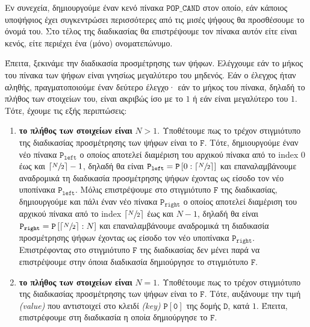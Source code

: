 	Εν συνεχεία, δημιουργούμε έναν κενό πίνακα $\mathtt{POP\_CAND}$ στον οποίο, εάν κάποιος υποψήφιος έχει συγκεντρώσει περισσότερες από τις μισές ψήφους θα προσθέσουμε το όνομά του. Στο τέλος της διαδικασίας θα επιστρέψουμε τον πίνακα αυτόν είτε είναι κενός, είτε περιέχει ένα (μόνο) ονοματεπώνυμο.\par
	Έπειτα, ξεκινάμε την διαδικασία προσμέτρησης των ψήφων. Ελέγχουμε εάν το μήκος του πίνακα των ψήφων είναι γνησίως μεγαλύτερο του μηδενός. Εάν ο έλεγχος ήταν αληθής, πραγματοποιούμε έναν δεύτερο έλεγχο· εάν το μήκος του πίνακα, δηλαδή το πλήθος των στοιχείων του, είναι ακριβώς ίσο με το $1$ ή εάν είναι μεγαλύτερο του $1$. Τότε, έχουμε τις εξής περιπτώσεις:\begin{enumerate}[label=\roman*.]
			\item \textbf{το πλήθος των στοιχείων είναι} $N>1$. Υποθέτουμε πως το τρέχον στιγμιότυπο της διαδικασίας προσμέτρησης των ψήφων είναι το $\mathtt{F}$. Τότε, δημιουργούμε έναν νέο πίνακα $\mathtt{P_{left}}$ ο οποίος αποτελεί διαμέριση του αρχικού πίνακα από το index $0$ έως και $\left\lceil\sfrac{N}{2}\right\rceil-1$, δηλαδή θα είναι $\mathtt{P_{left}=P}\left[0:\left\lceil\sfrac{N}{2}\right\rceil\right]$ και επαναλαμβάνουμε αναδρομικά τη διαδικασία προσμέτρησης ψήφων έχοντας ως είσοδο τον νέο υποπίνακα $\mathtt{P_{left}}$. Μόλις επιστρέψουμε στο στιγμιότυπο $\mathtt{F}$ της διαδικασίας, δημιουργούμε και πάλι έναν νέο πίνακα $\mathtt{P_{right}}$ ο οποίος αποτελεί διαμέριση του αρχικού πίνακα από το index $\left\lceil\sfrac{N}{2}\right\rceil$ έως και $N-1$, δηλαδή θα είναι $\mathtt{P_{right}=P}\left[\left\lceil\sfrac{N}{2}\right\rceil:N\right]$ και επαναλαμβάνουμε αναδρομικά τη διαδικασία προσμέτρησης ψήφων έχοντας ως είσοδο τον νέο υποπίνακα $\mathtt{P_{right}}$. Επιστρέφοντας στο στιγμιότυπο $\mathtt{F}$ της διαδικασίας δεν μένει παρά να επιστρέψουμε στην όποια διαδικασία δημιούργησε το στιγμιότυπο $\mathtt{F}$.
			\item \textbf{το πλήθος των στοιχείων είναι} $N=1$. Υποθέτουμε πως το τρέχον στιγμιότυπο της διαδικασίας προσμέτρησης των ψήφων είναι το $\mathtt{F}$. Τότε, αυξάνουμε την τιμή \textsl{(value)} που αντιστοιχεί στο κλειδί \textsl{(key)} $\mathtt{P[0]}$ της δομής $\mathtt{D}$, κατά $1$. Έπειτα, επιστρέφουμε στη διαδικασία η οποία δημιούργησε το $\mathtt{F}$.
		\end{enumerate}

